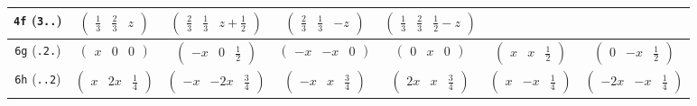 \documentclass[fleqn,9pt,landscape]{jsarticle}
\begin{document}
\begin{center}
\begin{longtable}{ccccccc}
{\tt 4f} ({\tt 3..}) & $ \begin{pmatrix} \frac{1}{3} & \frac{2}{3} & z \end{pmatrix} $ & $ \begin{pmatrix} \frac{2}{3} & \frac{1}{3} & z + \frac{1}{2} \end{pmatrix} $ & $ \begin{pmatrix} \frac{2}{3} & \frac{1}{3} & - z \end{pmatrix} $ & $ \begin{pmatrix} \frac{1}{3} & \frac{2}{3} & \frac{1}{2} - z \end{pmatrix} $ & $  $ & $  $ \\ \hline
{\tt 6g} ({\tt .2.}) & $ \begin{pmatrix} x & 0 & 0 \end{pmatrix} $ & $ \begin{pmatrix} - x & 0 & \frac{1}{2} \end{pmatrix} $ & $ \begin{pmatrix} - x & - x & 0 \end{pmatrix} $ & $ \begin{pmatrix} 0 & x & 0 \end{pmatrix} $ & $ \begin{pmatrix} x & x & \frac{1}{2} \end{pmatrix} $ & $ \begin{pmatrix} 0 & - x & \frac{1}{2} \end{pmatrix} $ \\ \hline
{\tt 6h} ({\tt ..2}) & $ \begin{pmatrix} x & 2 x & \frac{1}{4} \end{pmatrix} $ & $ \begin{pmatrix} - x & - 2 x & \frac{3}{4} \end{pmatrix} $ & $ \begin{pmatrix} - x & x & \frac{3}{4} \end{pmatrix} $ & $ \begin{pmatrix} 2 x & x & \frac{3}{4} \end{pmatrix} $ & $ \begin{pmatrix} x & - x & \frac{1}{4} \end{pmatrix} $ & $ \begin{pmatrix} - 2 x & - x & \frac{1}{4} \end{pmatrix} $ \\ \hline

\end{longtable}
\end{center}
\end{document}
